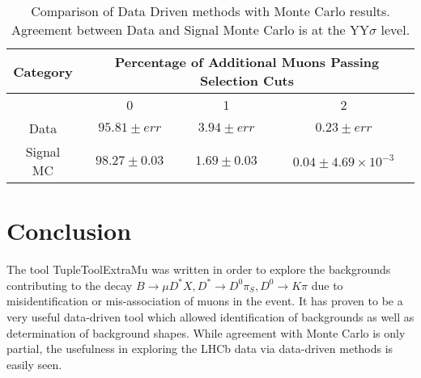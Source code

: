 \documentclass[11pt]{article}%
\begin{document}
\begin{flushleft}
\begin{linenumbers}
\begin{table}[htdp]
	\begin{center}
		\begin{tabular}{c c c c}
		\hline
		Category & \multicolumn{3}{c}{Percentage of Additional Muons Passing Selection Cuts} \\ \hline
		 & 0 & 1& 2 \\ \hline\hline
		Data & $95.81 \pm err$& $3.94 \pm err$ &$ 0.23 \pm err$ \\
		Signal MC & $98.27\pm 0.03$& $1.69\pm 0.03$& $0.04\pm 4.69\times 10^{-3}$\\ \hline \hline
		\end{tabular}
	\end{center}
	\label{table:mc_vs_data}
	\caption{Comparison of Data Driven methods with Monte Carlo results. Agreement between Data and Signal Monte Carlo is at the YY$\sigma$ level.}
\end{table}%


\section{Conclusion}
The tool TupleToolExtraMu was written in order to explore the backgrounds contributing to the decay $B\to \mu D^* X, D^*\to D^0\pi_S,D^0\to K\pi$ due to misidentification or mis-association of muons in the event. It has proven to be a very useful data-driven tool which allowed identification of backgrounds as well as determination of background shapes. While agreement with Monte Carlo is only partial, the usefulness in exploring the LHCb data via data-driven methods is easily seen.
\end{linenumbers}
\end{flushleft}

%
\end{document}
